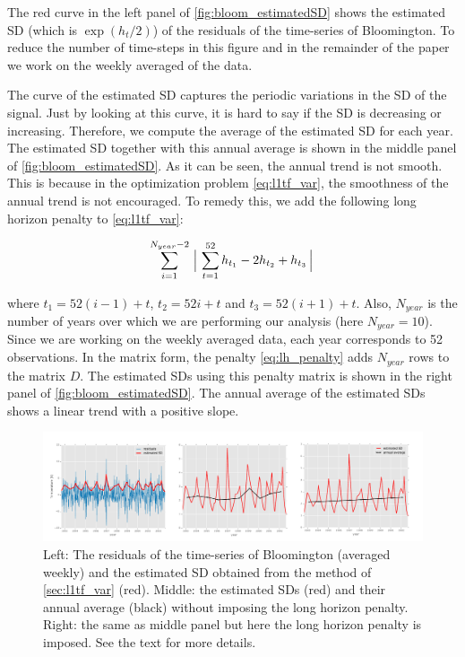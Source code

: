 \documentclass{article}
\begin{document}
The red curve in the left panel of \autoref{fig:bloom_estimatedSD} shows the estimated SD (which is $\exp(h_t/2)$) of the residuals of the time-series of Bloomington. To reduce the number of time-steps in this figure and in the remainder of the paper we work on the weekly averaged of the data. 

The curve of the estimated SD captures the periodic variations in the SD of the signal. Just by looking at this curve, it is hard to say if the SD is decreasing or increasing. Therefore, we compute the average of the estimated SD for each year. The estimated SD together with this annual average is shown in the middle panel of \autoref{fig:bloom_estimatedSD}. As it can be seen, the annual trend is not smooth. This is because in the optimization problem \eqref{eq:l1tf_var}, the smoothness of the annual trend is not encouraged. To remedy this, we add the following long horizon penalty to \eqref{eq:l1tf_var}:

\begin{equation}
\sum_{i=1}^{N_{year}-2} \Big\arrowvert \sum_{t=1}^{52} h_{t_1}-2h_{t_2}+h_{t_3}  \Big\arrowvert
\label{eq:lh_penalty}
\end{equation}

 where $t_1=52(i-1)+t$, $t_2=52i+t$ and $t_3=52(i+1)+t$. Also, $N_{year}$ is the number of years over which we are performing our analysis (here $N_{year}=10$). Since we are working on the weekly averaged data, each year corresponds to 52 observations. In the matrix form, the penalty \eqref{eq:lh_penalty} adds $N_{year}$ rows to the matrix $D$. The estimated SDs using this penalty matrix is shown in the right panel of \autoref{fig:bloom_estimatedSD}. The annual average of the estimated SDs shows a linear trend with a positive slope.

\begin{figure}[ht]
	\vskip 0.2in
	\begin{center}
		\centerline{\includegraphics[width=\columnwidth]{Figures/bloom_estimatedSD}}
		\caption{Left: The residuals of the time-series of Bloomington (averaged weekly) and the estimated SD obtained from the method of \autoref{sec:l1tf_var} (red). Middle: the estimated SDs (red) and their annual average (black) without imposing the long horizon penalty. Right: the same as middle panel but here the long horizon penalty is imposed. See the text for more details.}
		\label{fig:bloom_estimatedSD}
	\end{center}
	\vskip -0.2in
\end{figure} 
\end{document}
